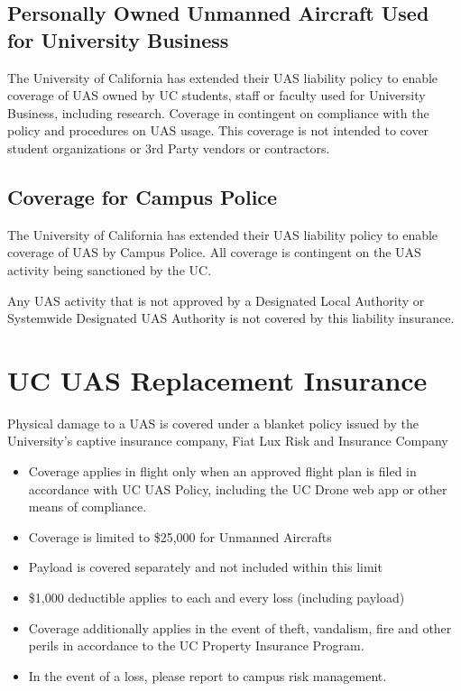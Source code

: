 \documentclass[
]{book}
\providecommand{\tightlist}{%
  \setlength{\itemsep}{0pt}\setlength{\parskip}{0pt}}
\begin{document}
\hypertarget{ss-personally-owned-UAS-coverage}{%
\section{Personally Owned Unmanned Aircraft Used for University Business}\label{ss-personally-owned-UAS-coverage}}

The University of California has extended their UAS liability policy to enable coverage of UAS owned by UC students, staff or faculty used for University Business, including research. Coverage in contingent on compliance with the policy and procedures on UAS usage. This coverage is not intended to cover student organizations or 3rd Party vendors or contractors.

\hypertarget{ss-campus-police-coverage}{%
\section{Coverage for Campus Police}\label{ss-campus-police-coverage}}

The University of California has extended their UAS liability policy to enable coverage of UAS by Campus Police. All coverage is contingent on the UAS activity being sanctioned by the UC.

Any UAS activity that is not approved by a Designated Local Authority or Systemwide Designated UAS Authority is not covered by this liability insurance.

\hypertarget{ch-hull-insurance}{%
\chapter{UC UAS Replacement Insurance}\label{ch-hull-insurance}}

Physical damage to a UAS is covered under a blanket policy issued by the University's captive insurance company, Fiat Lux Risk and Insurance Company

\begin{itemize}
\tightlist
\item
  Coverage applies in flight only when an approved flight plan is filed in accordance with UC UAS Policy, including the UC Drone web app or other means of compliance.\\
\item
  Coverage is limited to \$25,000 for Unmanned Aircrafts
\item
  Payload is covered separately and not included within this limit
\item
  \$1,000 deductible applies to each and every loss (including payload)
\item
  Coverage additionally applies in the event of theft, vandalism, fire and other perils in accordance to the UC Property Insurance Program.
\item
  In the event of a loss, please report to campus risk management.
\end{itemize}
\end{document}
